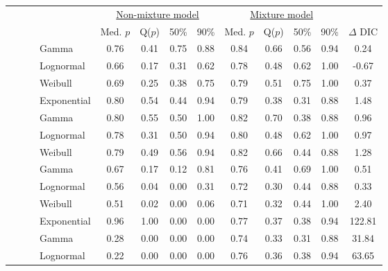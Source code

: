 \documentclass[useAMS,usenatbib,referee,12pt]{article}
\begin{document}
\begin{table}[ht]\centering\small
\begin{tabular}{l|l|l|l|cccc|cccc||c}
 \multicolumn{4}{c|}{ } & \multicolumn{4}{c|}{\underline{Non-mixture model}} & \multicolumn{4}{c||}{\underline{Mixture model}} & \\
 \multicolumn{4}{c|}{ } & Med. $p$ & Q($p$) & 50\% & 90\% & Med. $p$ & Q($p$) & 50\% & 90\% & $\Delta$ DIC \\ 
  \hline
  \hline
 \parbox[t]{2mm}{} & \parbox[t]{2mm}{} & \parbox[t]{2mm}{} & Gamma & 0.76 & 0.41 & 0.75 & 0.88 & 0.84 & 0.66 & 0.56 & 0.94 & 0.24 \\ 
 & & &   Lognormal & 0.66 & 0.17 & 0.31 & 0.62 & 0.78 & 0.48 & 0.62 & 1.00 & -0.67 \\ 
 & & &   Weibull & 0.69 & 0.25 & 0.38 & 0.75 & 0.79 & 0.51 & 0.75 & 1.00 & 0.37 \\ 
 & & &   Exponential & 0.80 & 0.54 & 0.44 & 0.94 & 0.79 & 0.38 & 0.31 & 0.88 & 1.48 \\ 
 & & \parbox[t]{2mm}{} &  Gamma & 0.80 & 0.55 & 0.50 & 1.00 & 0.82 & 0.70 & 0.38 & 0.88 & 0.96 \\ 
 & & &   Lognormal & 0.78 & 0.31 & 0.50 & 0.94 & 0.80 & 0.48 & 0.62 & 1.00 & 0.97 \\ 
 & & &   Weibull & 0.79 & 0.49 & 0.56 & 0.94 & 0.82 & 0.66 & 0.44 & 0.88 & 1.28 \\ 
& \parbox[t]{2mm}{} & \parbox[t]{2mm}{} & Gamma & 0.67 & 0.17 & 0.12 & 0.81 & 0.76 & 0.41 & 0.69 & 1.00 & 0.51 \\ 
 & & &   Lognormal & 0.56 & 0.04 & 0.00 & 0.31 & 0.72 & 0.30 & 0.44 & 0.88 & 0.33 \\ 
 & & &   Weibull & 0.51 & 0.02 & 0.00 & 0.06 & 0.71 & 0.32 & 0.44 & 1.00 & 2.40 \\ 
 & & &   Exponential & 0.96 & 1.00 & 0.00 & 0.00 & 0.77 & 0.37 & 0.38 & 0.94 & 122.81 \\ 
 & & \parbox[t]{2mm}{} & Gamma & 0.28 & 0.00 & 0.00 & 0.00 & 0.74 & 0.33 & 0.31 & 0.88 & 31.84 \\ 
 & & &   Lognormal & 0.22 & 0.00 & 0.00 & 0.00 & 0.76 & 0.36 & 0.38 & 0.94 & 63.65 \\ 

\end{tabular}
\end{table}
\end{document}
